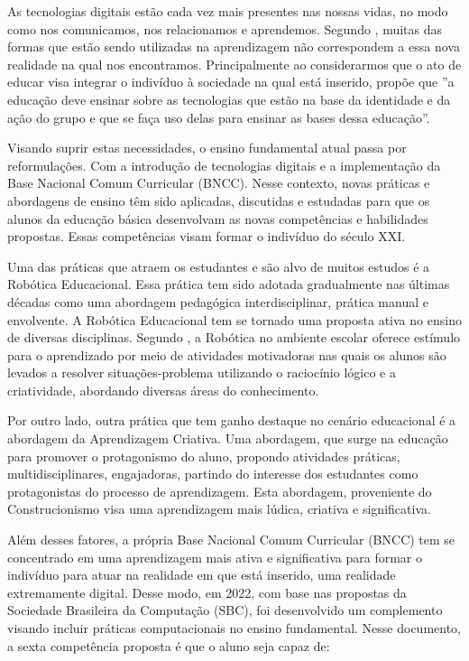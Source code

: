 \documentclass[portuguese]{textolivre}
\begin{document}
As tecnologias digitais estão cada vez mais presentes nas nossas vidas, no modo como nos comunicamos, nos relacionamos e aprendemos. Segundo \textcite {moran}, muitas das formas que estão sendo utilizadas na aprendizagem não correspondem a essa nova realidade na qual nos encontramos. Principalmente ao considerarmos que o ato de educar visa integrar o indivíduo à sociedade na qual está inserido, \textcite [p. 43]{kenski} propõe que ”a educação deve ensinar sobre as tecnologias que estão na base da identidade e da ação do grupo e que se faça uso delas para ensinar as bases dessa educação”.

Visando suprir estas necessidades, o ensino fundamental atual passa por reformulações. Com a introdução de tecnologias digitais e a implementação da Base Nacional Comum Curricular (BNCC). Nesse contexto, novas práticas e abordagens de ensino têm sido aplicadas, discutidas e estudadas para que os alunos da educação básica desenvolvam as novas competências e habilidades propostas. Essas competências visam formar o indivíduo do século XXI.

Uma das práticas que atraem os estudantes e são alvo de muitos estudos é a Robótica Educacional. Essa prática tem sido adotada gradualmente nas últimas décadas como uma abordagem pedagógica interdisciplinar, prática manual e envolvente. A Robótica Educacional tem se tornado uma proposta ativa no ensino de diversas disciplinas. Segundo \textcite{osorio}, a Robótica no ambiente escolar oferece estímulo para o aprendizado por meio de atividades motivadoras nas quais os alunos são levados a resolver situações-problema utilizando o raciocínio lógico e a criatividade, abordando diversas áreas do conhecimento.

Por outro lado, outra prática que tem ganho destaque no cenário educacional é a abordagem da Aprendizagem Criativa. Uma abordagem, que surge na educação para promover o protagonismo do aluno, propondo atividades práticas, multidisciplinares, engajadoras,  partindo do interesse dos estudantes como protagonistas do processo de aprendizagem. Esta abordagem, proveniente do Construcionismo visa uma aprendizagem mais lúdica, criativa e significativa.

Além desses fatores, a própria Base Nacional Comum Curricular (BNCC) tem se concentrado em uma aprendizagem mais ativa e significativa para formar o indivíduo para atuar na realidade em que está inserido, uma realidade extremamente digital. Desse modo, em 2022, com base nas propostas da Sociedade Brasileira da Computação (SBC), foi desenvolvido um complemento visando incluir práticas computacionais no ensino fundamental. Nesse documento, a sexta competência proposta é que o aluno seja capaz de:
\end{document}
